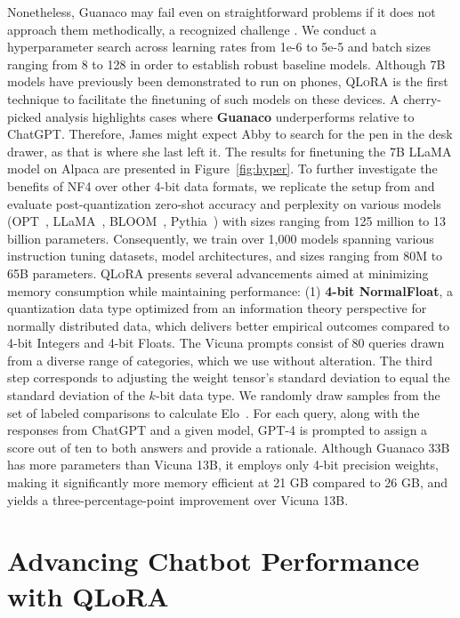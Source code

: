 Nonetheless, {Guanaco} may fail even on straightforward problems if it does not approach them methodically, a recognized challenge \cite{weichain}. We conduct a hyperparameter search across learning rates from 1e-6 to 5e-5 and batch sizes ranging from 8 to 128 in order to establish robust baseline models. Although 7B models have previously been demonstrated to run on phones, \textsc{QLoRA} is the first technique to facilitate the finetuning of such models on these devices. A cherry-picked analysis highlights cases where \textbf{Guanaco} underperforms relative to ChatGPT. Therefore, James might expect Abby to search for the pen in the desk drawer, as that is where she last left it. The results for finetuning the 7B LLaMA model on Alpaca are presented in Figure~\ref{fig:hyper}. To further investigate the benefits of NF4 over other 4-bit data formats, we replicate the setup from \citet{dettmers2022case} and evaluate post-quantization zero-shot accuracy and perplexity on various models (OPT~\citep{zhang2022opt}, LLaMA~\citep{touvron2023llama}, BLOOM~\citep{scao2022bloom}, Pythia~\citep{biderman2023pythia}) with sizes ranging from 125 million to 13 billion parameters. Consequently, we train over 1,000 models spanning various instruction tuning datasets, model architectures, and sizes ranging from 80M to 65B parameters. \textsc{QLoRA} presents several advancements aimed at minimizing memory consumption while maintaining performance: (1) \textbf{4-bit NormalFloat}, a quantization data type optimized from an information theory perspective for normally distributed data, which delivers better empirical outcomes compared to 4-bit Integers and 4-bit Floats. The Vicuna prompts consist of 80 queries drawn from a diverse range of categories, which we use without alteration. The third step corresponds to adjusting the weight tensor's standard deviation to equal the standard deviation of the $k$-bit data type. We randomly draw samples from the set of labeled comparisons to calculate Elo~\citep{elo1967proposed,elo1978rating}. For each query, along with the responses from ChatGPT and a given model, GPT-4 is prompted to assign a score out of ten to both answers and provide a rationale. Although {Guanaco} 33B has more parameters than Vicuna 13B, it employs only 4-bit precision weights, making it significantly more memory efficient at 21 GB compared to 26 GB, and yields a three-percentage-point improvement over Vicuna 13B. \section{Advancing Chatbot Performance with QLoRA}
